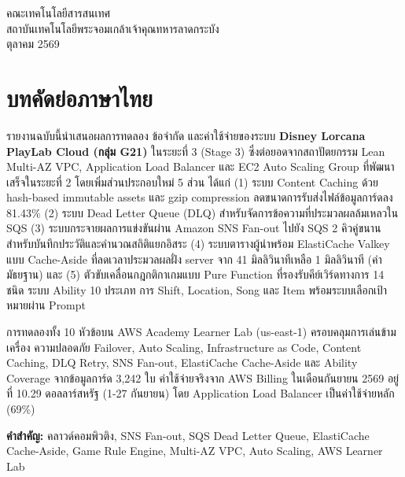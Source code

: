\documentclass[12pt,a4paper]{report}
\begin{document}
\begin{titlepage}
\begin{center}
    \vfill
    {\fontsize{14pt}{18pt}\selectfont
    คณะเทคโนโลยีสารสนเทศ\\
    สถาบันเทคโนโลยีพระจอมเกล้าเจ้าคุณทหารลาดกระบัง\\
    ตุลาคม 2569}
\end{center}
\end{titlepage}

\setcounter{page}{1}

\chapter*{บทคัดย่อภาษาไทย}

รายงานฉบับนี้นำเสนอผลการทดลอง ข้อจำกัด และค่าใช้จ่ายของระบบ \textbf{Disney Lorcana PlayLab Cloud (กลุ่ม G21)} ในระยะที่ 3 (Stage 3) ซึ่งต่อยอดจากสถาปัตยกรรม Lean Multi-AZ VPC, Application Load Balancer และ EC2 Auto Scaling Group ที่พัฒนาเสร็จในระยะที่ 2 โดยเพิ่มส่วนประกอบใหม่ 5 ส่วน ได้แก่ (1) ระบบ Content Caching ด้วย hash-based immutable assets และ gzip compression ลดขนาดการรับส่งไฟล์ข้อมูลการ์ดลง 81.43\% (2) ระบบ Dead Letter Queue (DLQ) สำหรับจัดการข้อความที่ประมวลผลล้มเหลวใน SQS (3) ระบบกระจายผลการแข่งขันผ่าน Amazon SNS Fan-out ไปยัง SQS 2 คิวคู่ขนานสำหรับบันทึกประวัติและคำนวณสถิติแยกอิสระ (4) ระบบตารางผู้นำพร้อม ElastiCache Valkey แบบ Cache-Aside ที่ลดเวลาประมวลผลฝั่ง server จาก 41 มิลลิวินาทีเหลือ 1 มิลลิวินาที (ค่ามัธยฐาน) และ (5) ตัวขับเคลื่อนกฎกติกาเกมแบบ Pure Function ที่รองรับคีย์เวิร์ดทางการ 14 ชนิด ระบบ Ability 10 ประเภท การ Shift, Location, Song และ Item พร้อมระบบเลือกเป้าหมายผ่าน Prompt

การทดลองทั้ง 10 หัวข้อบน AWS Academy Learner Lab (us-east-1) ครอบคลุมการเล่นข้ามเครื่อง ความปลอดภัย Failover, Auto Scaling, Infrastructure as Code, Content Caching, DLQ Retry, SNS Fan-out, ElastiCache Cache-Aside และ Ability Coverage จากข้อมูลการ์ด 3,242 ใบ ค่าใช้จ่ายจริงจาก AWS Billing ในเดือนกันยายน 2569 อยู่ที่ 10.29 ดอลลาร์สหรัฐ (1-27 กันยายน) โดย Application Load Balancer เป็นค่าใช้จ่ายหลัก (69\%)

\vspace{0.6cm}
\noindent \textbf{คำสำคัญ:} คลาวด์คอมพิวติง, SNS Fan-out, SQS Dead Letter Queue, ElastiCache Cache-Aside, Game Rule Engine, Multi-AZ VPC, Auto Scaling, AWS Learner Lab

\newpage
\end{document}
